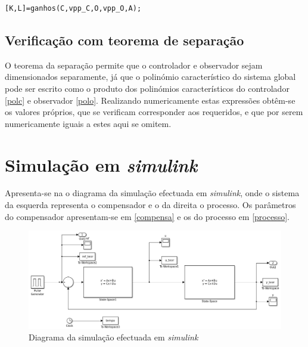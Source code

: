 \documentclass[%
  reprint,
  nofootinbib,
  amsmath,amssymb,
  aps,
  10pt,
  a4paper
]{revtex4-1}
\begin{document}
\begin{lstlisting}[label=list2, caption={Código Matlab para o cálculo dos ganhos $K$ do controlador e $L$ do observador a partir das matrizes de controlabilidade $\mathcal{C}$, observabilidade $\mathcal{O}$ e da dinâmica $A$, e os valores próprios desejados para o controlador $vpp\_C$ e observador $vpp\_O$. A função {\it ganhos} apresenta-se em anexo no ficheiro com o mesmo nome.}]
[K,L]=ganhos(C,vpp_C,O,vpp_O,A);
\end{lstlisting}
\subsection{Verificação com teorema de separação}
O teorema da separação permite que o controlador e observador sejam dimensionados separamente, já que o polinómio característico do sistema global pode ser escrito como o produto dos polinómios característicos do controlador \eqref{polc} e observador \eqref{polo}.
Realizando numericamente estas expressões obtêm-se os valores próprios, que se verificam corresponder aos requeridos, e que por serem numericamente iguais a estes aqui se omitem.



\section{Simulação em {\it simulink}}

Apresenta-se na  o diagrama da simulação efectuada em {\it simulink}, onde o sistema da esquerda representa o compensador e o da direita o processo. Os parâmetros do compensador apresentam-se em \eqref{compensa} e os do processo em \eqref{processo}.

\begin{figure}[T]
  \includegraphics[width=.6\textheight]{../img/simulink.png}%
  \caption{\label{../img/simulink.png} Diagrama da simulação efectuada em {\it simulink}}
\end{figure}
\end{document}
